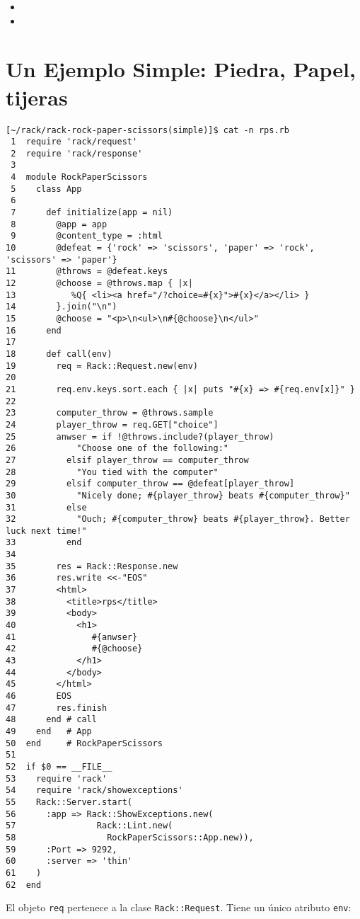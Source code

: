 
\begin{itemize}
\item
{}
\item
{}
\end{itemize}


\section{Un Ejemplo Simple: Piedra, Papel, tijeras}

\begin{verbatim}
[~/rack/rack-rock-paper-scissors(simple)]$ cat -n rps.rb
 1  require 'rack/request'
 2  require 'rack/response'
 3  
 4  module RockPaperScissors
 5    class App 
 6  
 7      def initialize(app = nil)
 8        @app = app
 9        @content_type = :html
10        @defeat = {'rock' => 'scissors', 'paper' => 'rock', 'scissors' => 'paper'}
11        @throws = @defeat.keys
12        @choose = @throws.map { |x| 
13           %Q{ <li><a href="/?choice=#{x}">#{x}</a></li> }
14        }.join("\n")
15        @choose = "<p>\n<ul>\n#{@choose}\n</ul>"
16      end
17  
18      def call(env)
19        req = Rack::Request.new(env)
20  
21        req.env.keys.sort.each { |x| puts "#{x} => #{req.env[x]}" }
22  
23        computer_throw = @throws.sample
24        player_throw = req.GET["choice"]
25        anwser = if !@throws.include?(player_throw)
26            "Choose one of the following:"
27          elsif player_throw == computer_throw
28            "You tied with the computer"
29          elsif computer_throw == @defeat[player_throw]
30            "Nicely done; #{player_throw} beats #{computer_throw}"
31          else
32            "Ouch; #{computer_throw} beats #{player_throw}. Better luck next time!"
33          end
34  
35        res = Rack::Response.new
36        res.write <<-"EOS"
37        <html>
38          <title>rps</title>
39          <body>
40            <h1>
41               #{anwser}
42               #{@choose}
43            </h1>
44          </body>
45        </html>
46        EOS
47        res.finish
48      end # call
49    end   # App
50  end     # RockPaperScissors
51  
52  if $0 == __FILE__
53    require 'rack'
54    require 'rack/showexceptions'
55    Rack::Server.start(
56      :app => Rack::ShowExceptions.new(
57                Rack::Lint.new(
58                  RockPaperScissors::App.new)), 
59      :Port => 9292,
60      :server => 'thin'
61    )
62  end
\end{verbatim}
El objeto \verb|req| pertenece a la clase \verb|Rack::Request|. Tiene 
un único atributo \verb|env|:

